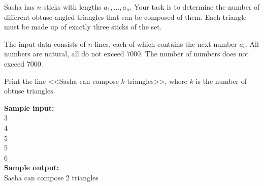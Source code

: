 \documentclass[a4paper]{article}
\begin{document}
Sasha has $n$ sticks with lengths $a_1, \ldots, a_n$. Your task is to determine the number of different obtuse-angled triangles that can be composed of them. Each triangle must be made up of exactly three sticks of the set.

The input data consists of $n$ lines, each of which contains the next number $a_i$. All numbers are natural, all do not exceed $7000$. The number of numbers does not exceed $7000$.

Print the line <<Sasha can compose $k$ triangles>>, where $k$ is the number of obtuse triangles.

\LINE

\noindent \textbf{Sample input:}\\
3\\
4\\
5\\
5\\
6\\


\noindent \textbf{Sample output:}\\
Sasha can compose 2 triangles
\end{document}
